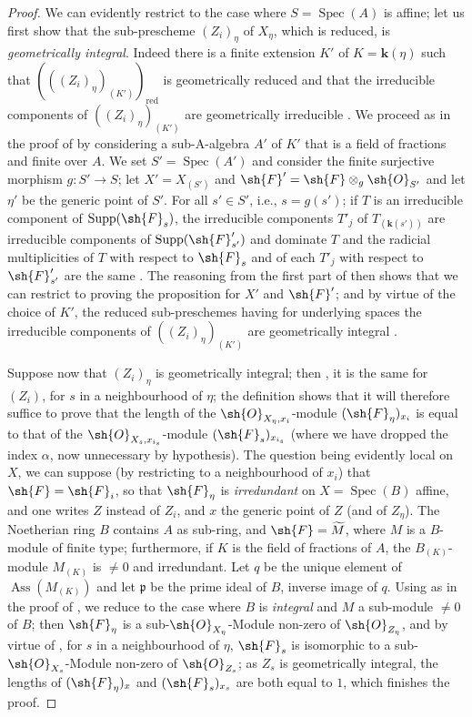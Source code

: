\begin{proof}
\label{IV.9.8.6-proof}
We can evidently restrict to the case where $S=\operatorname{Spec}(A)$ is affine; let us first show that the sub-prescheme $(Z_i)_\eta$ of $X_\eta$, which is reduced, is \emph{geometrically integral}.
Indeed there is a finite extension $K'$ of $K=\mathbf{k}(\eta)$ such that $(((Z_i)_\eta)_{(K')})_{\mathrm{red}}$ is geometrically reduced and that the irreducible components of $((Z_i)_\eta)_{(K')}$ are geometrically irreducible .
We proceed as in the proof of  by considering a sub-A-algebra $A'$ of $K'$ that is a field of fractions and finite over $A$.
We set $S'=\operatorname{Spec}(A')$ and consider the finite surjective morphism $g:S'\to S$; let $X'=X_{(S')}$ and $\sh{F}'=\sh{F}\otimes_g\sh{O}_{S'}$ and let $\eta'$ be the generic point of $S'$.
For all $s'\in S'$, i.e., $s=g(s')$; if $T$ is an irreducible component of $\operatorname{Supp}(\sh{F}_s)$, the irreducible components $T'_j$ of $T_{(\mathbf{k}(s'))}$ are irreducible components of $\operatorname{Supp}(\sh{F}'_{s'})$ and dominate $T$  and the radicial multiplicities of $T$ with respect to $\sh{F}_s$ and of each $T'_j$ with respect to $\sh{F}'_{s'}$ are the same .
The reasoning from the first part of  then shows that we can restrict to proving the proposition for $X'$ and $\sh{F}'$; and by virtue of the choice of $K'$, the reduced sub-preschemes having for underlying spaces the irreducible components of $((Z_i)_\eta)_{(K')}$ are geometrically integral .

Suppose now that $(Z_i)_\eta$ is geometrically integral; then , it is the same for $(Z_i)$, for $s$ in a neighbourhood of $\eta$; the definition  shows that it will therefore suffice to prove that the length of the $\sh{O}_{X_\eta,x_i}$-module $(\sh{F}_\eta)_{x_i}$ is equal to that of the $\sh{O}_{X_s,x_{i_s}}$-module $(\sh{F}_s)_{x_{i_s}}$ (where we have dropped the index $\alpha$, now unnecessary by hypothesis).
The question being evidently local on $X$, we can suppose (by restricting to a neighbourhood of $x_i$) that $\sh{F}=\sh{F}_i$, so that $\sh{F}_\eta$ is \emph{irredundant} on $X=\operatorname{Spec}(B)$ affine, and one writes $Z$ instead of $Z_i$, and $x$ the generic point of $Z$ (and of $Z_\eta$).
The Noetherian ring $B$ contains $A$ as sub-ring, and $\sh{F}=\widetilde{M}$, where $M$ is a $B$-module of finite type; furthermore, if $K$ is the field of fractions of $A$, the $B_{(K)}$-module $M_{(K)}$ is $\neq 0$ and irredundant.
Let $q$ be the unique element of $\operatorname{Ass}(M_{(K)})$ and let $\mathfrak{p}$ be the prime ideal of $B$, inverse image of $q$.
Using  as in the proof of , we reduce to the case where $B$ is \emph{integral} and $M$ a sub-module $\neq 0$ of $B$; then $\sh{F}_\eta$ is a sub-$\sh{O}_{X_\eta}$-Module non-zero of $\sh{O}_{Z_\eta}$, and by virtue of , for $s$ in a neighbourhood of $\eta$, $\sh{F}_s$ is isomorphic to a sub-$\sh{O}_{X_s}$-Module non-zero of $\sh{O}_{Z_s}$; as $Z_s$ is geometrically integral, the lengths of $(\sh{F}_\eta)_x$ and $(\sh{F}_s)_{x_s}$ are both equal to $1$, which finishes the proof.
\end{proof}

